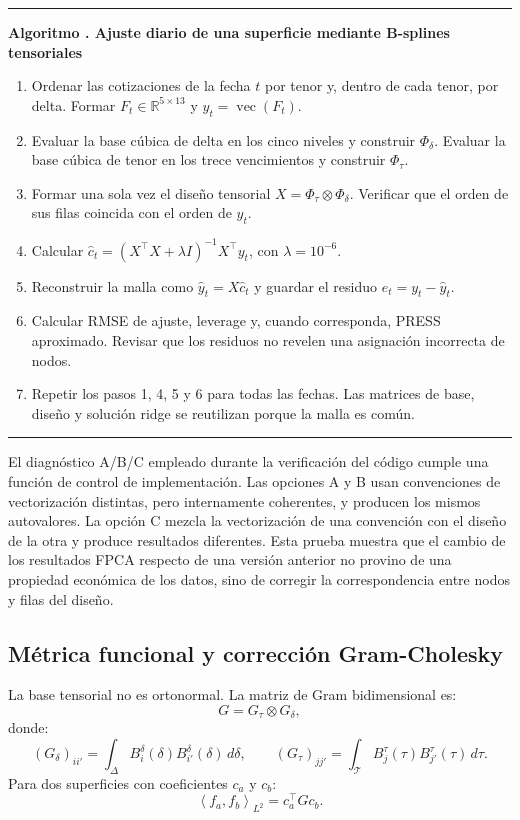 \documentclass[a4paper,11pt]{article}
\newcommand{\R}{\mathbb{R}}
\newcommand{\inner}[2]{\left\langle #1,#2 \right\rangle}
\newcounter{algoritmotesis}
\newenvironment{algoritmotesis}[1]{%
  \refstepcounter{algoritmotesis}%
  \par\medskip
  \noindent\begin{minipage}{\linewidth}
  \hrule\vspace{0.6em}
  \textbf{Algoritmo \thealgoritmotesis. #1}
  \begin{enumerate}
}{%
  \end{enumerate}
  \vspace{0.2em}\hrule
  \end{minipage}
  \par\medskip
}
\begin{document}
\begin{algoritmotesis}{Ajuste diario de una superficie mediante B-splines tensoriales}
  \item Ordenar las cotizaciones de la fecha \(t\) por tenor y, dentro de cada tenor, por delta. Formar \(F_t\in\R^{5\times13}\) y \(y_t=\operatorname{vec}(F_t)\).
  \item Evaluar la base cúbica de delta en los cinco niveles y construir \(\Phi_\delta\). Evaluar la base cúbica de tenor en los trece vencimientos y construir \(\Phi_\tau\).
  \item Formar una sola vez el diseño tensorial \(X=\Phi_\tau\otimes\Phi_\delta\). Verificar que el orden de sus filas coincida con el orden de \(y_t\).
  \item Calcular \(\widehat c_t=(X^\top X+\lambda I)^{-1}X^\top y_t\), con \(\lambda=10^{-6}\).
  \item Reconstruir la malla como \(\widehat y_t=X\widehat c_t\) y guardar el residuo \(e_t=y_t-\widehat y_t\).
  \item Calcular RMSE de ajuste, leverage y, cuando corresponda, PRESS aproximado. Revisar que los residuos no revelen una asignación incorrecta de nodos.
  \item Repetir los pasos 1, 4, 5 y 6 para todas las fechas. Las matrices de base, diseño y solución ridge se reutilizan porque la malla es común.
\end{algoritmotesis}

El diagnóstico A/B/C empleado durante la verificación del código cumple una función de control de implementación. Las opciones A y B usan convenciones de vectorización distintas, pero internamente coherentes, y producen los mismos autovalores. La opción C mezcla la vectorización de una convención con el diseño de la otra y produce resultados diferentes. Esta prueba muestra que el cambio de los resultados FPCA respecto de una versión anterior no provino de una propiedad económica de los datos, sino de corregir la correspondencia entre nodos y filas del diseño.

\subsection{Métrica funcional y corrección Gram-Cholesky}

La base tensorial no es ortonormal. La matriz de Gram bidimensional es:
\[
  G=G_\tau\otimes G_\delta,
\]
donde:
\[
  (G_\delta)_{ii'}=\int_{\Delta}B_i^\delta(\delta)B_{i'}^\delta(\delta)\,d\delta,
  \qquad
  (G_\tau)_{jj'}=\int_{\mathcal{T}}B_j^\tau(\tau)B_{j'}^\tau(\tau)\,d\tau.
\]
Para dos superficies con coeficientes \(c_a\) y \(c_b\):
\[
  \inner{f_a}{f_b}_{L^2}=c_a^\top G c_b.
\]
\end{document}
